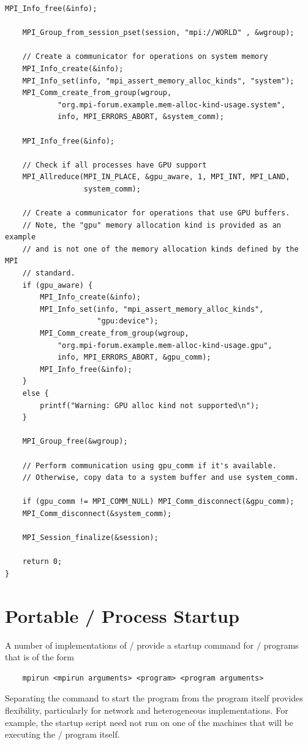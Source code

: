 \begin{example}
\begin{lstlisting}[language={[MPI]C}]
    MPI_Info_free(&info);

    MPI_Group_from_session_pset(session, "mpi://WORLD" , &wgroup);

    // Create a communicator for operations on system memory
    MPI_Info_create(&info);
    MPI_Info_set(info, "mpi_assert_memory_alloc_kinds", "system");
    MPI_Comm_create_from_group(wgroup,
            "org.mpi-forum.example.mem-alloc-kind-usage.system",
            info, MPI_ERRORS_ABORT, &system_comm);

    MPI_Info_free(&info);

    // Check if all processes have GPU support
    MPI_Allreduce(MPI_IN_PLACE, &gpu_aware, 1, MPI_INT, MPI_LAND,
                  system_comm);

    // Create a communicator for operations that use GPU buffers.
    // Note, the "gpu" memory allocation kind is provided as an example
    // and is not one of the memory allocation kinds defined by the MPI
    // standard.
    if (gpu_aware) {
        MPI_Info_create(&info);
        MPI_Info_set(info, "mpi_assert_memory_alloc_kinds",
                     "gpu:device");
        MPI_Comm_create_from_group(wgroup,
            "org.mpi-forum.example.mem-alloc-kind-usage.gpu",
            info, MPI_ERRORS_ABORT, &gpu_comm);
        MPI_Info_free(&info);
    }
    else {
        printf("Warning: GPU alloc kind not supported\n");
    }

    MPI_Group_free(&wgroup);

    // Perform communication using gpu_comm if it's available.
    // Otherwise, copy data to a system buffer and use system_comm.

    if (gpu_comm != MPI_COMM_NULL) MPI_Comm_disconnect(&gpu_comm);
    MPI_Comm_disconnect(&system_comm);

    MPI_Session_finalize(&session);

    return 0;
}
\end{lstlisting}
\end{example}

\section{Portable \texorpdfstring{\MPI/}{MPI} Process Startup}
\label{sec:inquiry-mpiexec}

A number of implementations of \mpi/ provide a startup command for \MPI/ programs
that is of the form
%
\begin{verbatim}
    mpirun <mpirun arguments> <program> <program arguments>
\end{verbatim}
Separating the command to start the program from the program itself provides
flexibility, particularly for network and heterogeneous implementations.  For
example, the startup script need not run on one of the machines that will be
executing the \MPI/ program itself.



